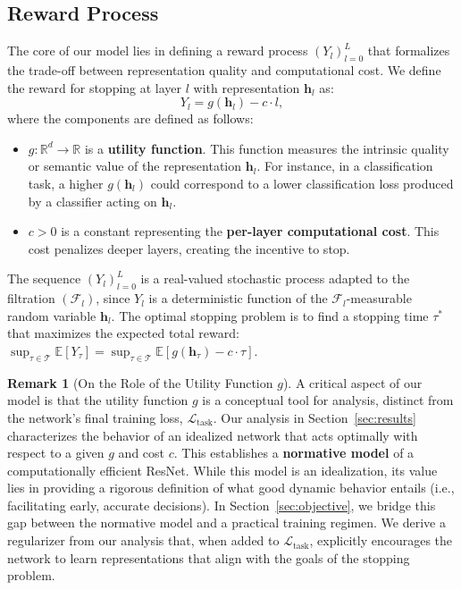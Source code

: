 \documentclass[12pt]{imsart}
\newcommand{\R}{\mathbb{R}}
\newcommand{\E}{\mathbb{E}}
\newcommand{\F}{\mathcal{F}}
\newcommand{\h}{\mathbf{h}}
\newcommand{\Ltask}{\mathcal{L}_{\text{task}}}
\theoremstyle{plain}
\theoremstyle{definition}
\newtheorem{remark}[theorem]{Remark}
\begin{document}
\subsection{Reward Process}
The core of our model lies in defining a reward process $(Y_l)_{l=0}^L$ that formalizes the trade-off between representation quality and computational cost. We define the reward for stopping at layer $l$ with representation $\h_l$ as:
\begin{equation} \label{eq:reward_func}
Y_l = g(\h_l) - c \cdot l,
\end{equation}
where the components are defined as follows:
\begin{itemize}
    \item $g: \R^d \to \R$ is a \textbf{utility function}. This function measures the intrinsic quality or semantic value of the representation $\h_l$. For instance, in a classification task, a higher $g(\h_l)$ could correspond to a lower classification loss produced by a classifier acting on $\h_l$.
    \item $c > 0$ is a constant representing the \textbf{per-layer computational cost}. This cost penalizes deeper layers, creating the incentive to stop.
\end{itemize}
The sequence $(Y_l)_{l=0}^L$ is a real-valued stochastic process adapted to the filtration $(\F_l)$, since $Y_l$ is a deterministic function of the $\F_l$-measurable random variable $\h_l$. The optimal stopping problem is to find a stopping time $\tau^*$ that maximizes the expected total reward: $\sup_{\tau \in \mathcal{T}} \E[Y_\tau] = \sup_{\tau \in \mathcal{T}} \E[g(\h_\tau) - c \cdot \tau]$.

\begin{remark}[On the Role of the Utility Function $g$]\label{rem:utility}
A critical aspect of our model is that the utility function $g$ is a conceptual tool for analysis, distinct from the network's final training loss, $\Ltask$. Our analysis in Section~\ref{sec:results} characterizes the behavior of an idealized network that acts optimally with respect to a given $g$ and cost $c$. This establishes a \textbf{normative model} of a computationally efficient ResNet. While this model is an idealization, its value lies in providing a rigorous definition of what good dynamic behavior entails (i.e., facilitating early, accurate decisions). In Section~\ref{sec:objective}, we bridge this gap between the normative model and a practical training regimen. We derive a regularizer from our analysis that, when added to $\Ltask$, explicitly encourages the network to learn representations that align with the goals of the stopping problem.
\end{remark}
\end{document}
